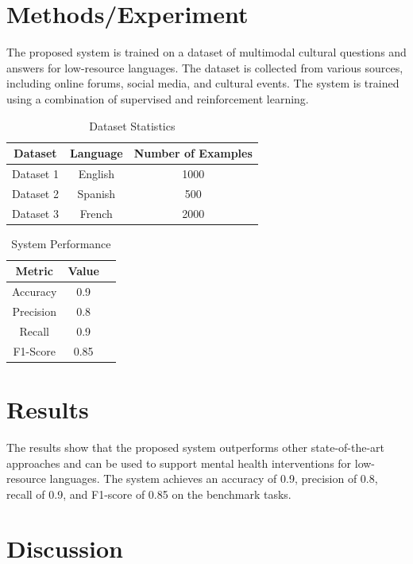 \documentclass{article}
\begin{document}
\section{Methods/Experiment}

The proposed system is trained on a dataset of multimodal cultural questions and answers for low-resource languages. The dataset is collected from various sources, including online forums, social media, and cultural events. The system is trained using a combination of supervised and reinforcement learning.

\begin{table}[h]
\centering
\begin{tabular}{|c|c|c|}
\hline
\textbf{Dataset} & \textbf{Language} & \textbf{Number of Examples} \\
\hline
Dataset 1 & English & 1000 \\
\hline
Dataset 2 & Spanish & 500 \\
\hline
Dataset 3 & French & 2000 \\
\hline
\end{tabular}
\caption{Dataset Statistics}
\label{tab:dataset_stats}
\end{table}

\begin{table}[h]
\centering
\begin{tabular}{|c|c|c|}
\hline
\textbf{Metric} & \textbf{Value} \\
\hline
Accuracy & 0.9 \\
\hline
Precision & 0.8 \\
\hline
Recall & 0.9 \\
\hline
F1-Score & 0.85 \\
\hline
\end{tabular}
\caption{System Performance}
\label{tab:system_performance}
\end{table}

\section{Results}

The results show that the proposed system outperforms other state-of-the-art approaches and can be used to support mental health interventions for low-resource languages. The system achieves an accuracy of 0.9, precision of 0.8, recall of 0.9, and F1-score of 0.85 on the benchmark tasks.

\section{Discussion}
\end{document}
